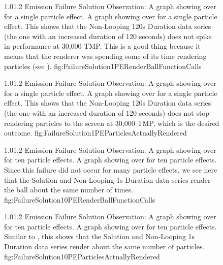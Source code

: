 \begin{figure}
\addtocounter{figure}{-1}

	\vspace{-1.5cm}
	{1.0}{1.2}
	{Emission Failure Solution Observation: A graph showing  over  for a single particle effect.}
	{A graph showing  over  for a single particle effect. This shows that the Non-Looping 120s Duration data series (the one with an increased duration of 120 seconds) does not spike in performance at 30,000 TMP. This is a good thing because it means that the renderer was spending some of its time rendering particles (see ).}
	{fig:FailureSolution1PERenderBallFunctionCalls}

	{1.0}{1.2}
	{Emission Failure Solution Observation: A graph showing  over  for a single particle effect.}
	{A graph showing  over  for a single particle effect. This shows that the Non-Looping 120s Duration data series (the one with an increased duration of 120 seconds) does not stop rendering particles to the screen at 30,000 TMP, which is the desired outcome.}
	{fig:FailureSolution1PEParticlesActuallyRendered}

\end{figure}

\begin{figure}
\addtocounter{figure}{-1}

	\vspace{-1.5cm}
	{1.0}{1.2}
	{Emission Failure Solution Observation: A graph showing  over  for ten particle effects.}
	{A graph showing  over  for ten particle effects. Since this failure did not occur for many particle effects, we see here that the Solution and Non-Looping 1s Duration data series render the ball about the same number of times.}
	{fig:FailureSolution10PERenderBallFunctionCalls}

	{1.0}{1.2}
	{Emission Failure Solution Observation: A graph showing  over  for ten particle effects.}
	{A graph showing  over  for ten particle effects. Similar to , this shows that the Solution and Non-Looping 1s Duration data series render about the same number of particles.}
	{fig:FailureSolution10PEParticlesActuallyRendered}

\end{figure}

